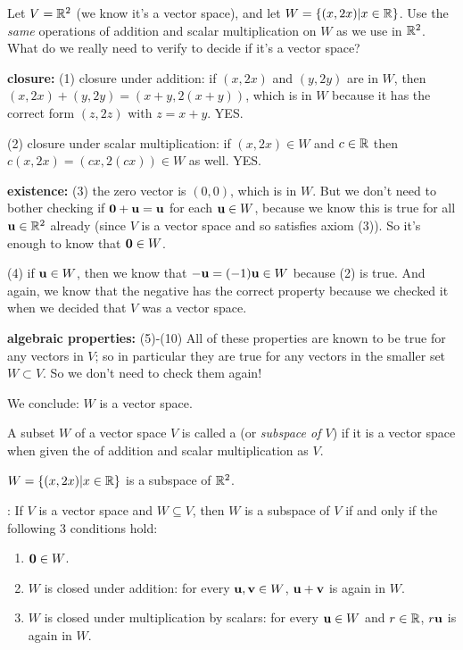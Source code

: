 \begin{myexample}
Let $V = \mathbb{R}^2$ (we know it's a vector space), and let $W = \{(x,2x) | x\in \mathbb{R}\}$.  Use the \emph{same} operations of addition and scalar multiplication
on $W$ as we use in $\mathbb{R}^2$.  What do we really need to verify to decide
if
it's a vector space?

{\bf closure:}  (1) closure under addition:  if $(x,2x)$ and $(y,2y)$ are in $W$,
then $(x,2x) + (y,2y) = (x+y, 2(x+y))$, which is in $W$ because it has
the correct form $(z,2z)$ with $z=x+y$.  YES.

(2) closure under scalar multiplication:  if $(x,2x) \in W$ and $c\in \mathbb{R}$
then $c(x,2x) = (cx,2(cx))\in W$ as well.  YES.

{\bf existence:}  (3) the zero vector is $(0,0)$, which is in $W$.  But we
don't need to bother checking if $\mathbf{0} + \mathbf{u} = \mathbf{u}$ for
each $\mathbf{u} \in W$, because we know this is true for all $\mathbf{u} \in \mathbb{R}^2$
already (since $V$ is a vector space and so satisfies axiom (3)).  So
it's enough to know that $\mathbf{0} \in W$.

(4) if $\mathbf{u} \in W$, then we know that $-\mathbf{u} = (-1)\mathbf{u} \in W$
because (2) is true.  And again, we know that the negative has the 
correct property because we checked it when we decided that $V$
was a vector space.

{\bf algebraic properties:} (5)-(10)  All of these properties are
known to be true for any vectors in $V$; so in particular they
are true for any vectors in the smaller set $W \subset V$.  So
we don't need to check them again!

We conclude:  $W$ is a vector space.  \end{myexample}

\begin{definition}
A subset $W$ of a vector space $V$ is called a 
(or \emph{subspace of $V$}) if it is a vector space when
given the  of addition and scalar multiplication as $V$.
\end{definition}

\begin{myexample}
$W = \{ (x,2x) | x\in \mathbb{R}\}$ is a subspace of $\mathbb{R}^2$. \end{myexample}

\begin{theorem} : 
If $V$ is a vector space and $W \subseteq V$, then $W$ is 
a subspace of $V$ if and only if the following 3 conditions
hold:
\begin{enumerate}
\item $\mathbf{0} \in W$.
\item $W$ is closed under addition:  for every $\mathbf{u}, \mathbf{v} \in W$, $\mathbf{u}+\mathbf{v}$ is again in $W$.
\item $W$ is closed under multiplication by scalars: for every $\mathbf{u} \in W$ and $r\in \mathbb{R}$, $r\mathbf{u}$ is again in $W$.
\end{enumerate}
\end{theorem}

